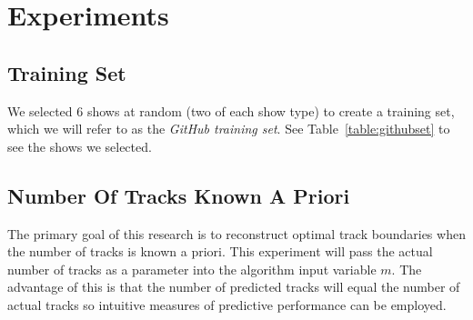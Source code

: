 \documentclass[twocolumn]{article}
\begin{document}
\section{Experiments}\label{sec:experiments}

\subsection{Training Set}\label{sec:training-set}

We selected $6$ shows at random (two of each show type)  to create a training set, which we will refer to as the \textit{GitHub training set}. See Table~\ref{table:githubset} to see the shows we selected.

\begin{table}[t]
	
	\centering
	\caption{The shows randomly selected for inclusion in the \textit{GitHub training set}.}
	\label{table:githubset}
	
\end{table}

\subsection{Number Of Tracks Known A Priori}\label{sec:apriori}

The primary goal of this research is to reconstruct optimal track boundaries when the number of tracks is known a priori. This experiment will pass the actual number of tracks as a parameter into the algorithm input variable $m$. The advantage of this is that the number of predicted tracks will equal the number of actual tracks so intuitive measures of predictive performance can be employed. 
\end{document}
